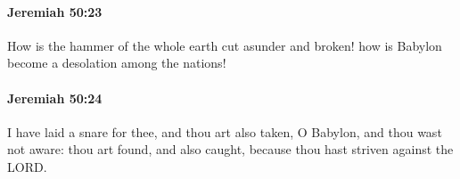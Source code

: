 		\paragraph{Jeremiah 50:23} %
			\label{JEREMIAH-50-23}

			How is the hammer of the whole earth cut asunder and broken! how is Babylon become a desolation among the nations!


		\paragraph{Jeremiah 50:24} %
			\label{JEREMIAH-50-24}

			I have laid a snare for thee, and thou art also taken, O Babylon, and thou wast not aware: thou art found, and also caught, because thou hast striven against the LORD.


